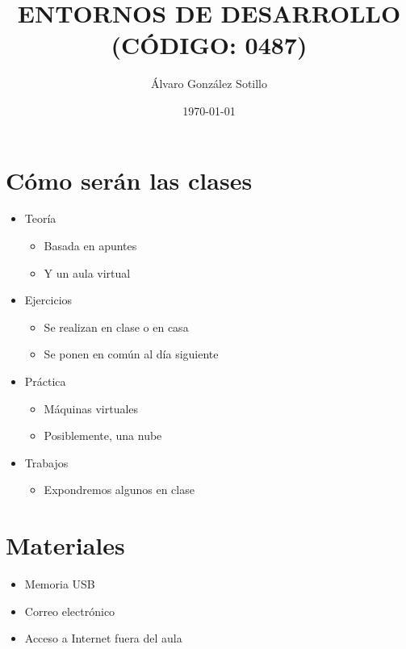 \documentclass[a4paper]{article}
\author{Álvaro González Sotillo}
\date{\today}
\title{ENTORNOS DE DESARROLLO\\\medskip
\large  (CÓDIGO: 0487)}
\begin{document}
\maketitle
\setcounter{tocdepth}{1}
\tableofcontents

\captionsetup{font=scriptsize}
\section{Cómo serán las clases}
\label{sec:org0000000}
\begin{itemize}
\item Teoría
\begin{itemize}
\item Basada en apuntes
\item Y un aula virtual
\end{itemize}
\item Ejercicios
\begin{itemize}
\item Se realizan en clase o en casa
\item Se ponen en común al día siguiente
\end{itemize}
\item Práctica
\begin{itemize}
\item Máquinas virtuales
\item Posiblemente, una nube
\end{itemize}
\item Trabajos
\begin{itemize}
\item Expondremos algunos en clase
\end{itemize}
\end{itemize}
\section{Materiales}
\label{sec:org0000003}
\begin{itemize}
\item Memoria USB
\item Correo electrónico
\item Acceso a Internet fuera del aula
\end{itemize}
\end{document}
